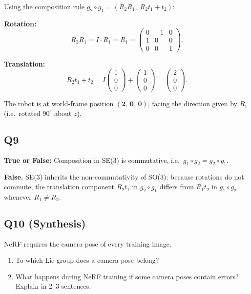 \documentclass[12pt]{article}
\begin{document}
\begin{answerbox}
Using the composition rule $g_2\circ g_1=(R_2 R_1,\;R_2 t_1+t_2)$:

\textbf{Rotation:}
\[
  R_2 R_1 = I\cdot R_1 = R_1
  = \begin{pmatrix}0&-1&0\\1&0&0\\0&0&1\end{pmatrix}.
\]

\textbf{Translation:}
\[
  R_2 t_1 + t_2 = I\begin{pmatrix}1\\0\\0\end{pmatrix}
                 + \begin{pmatrix}1\\0\\0\end{pmatrix}
                 = \begin{pmatrix}2\\0\\0\end{pmatrix}.
\]

The robot is at world-frame position $\mathbf{(2,\,0,\,0)}$, facing the
direction given by $R_1$ (i.e.\ rotated $90^\circ$ about $z$).
\end{answerbox}

\subsection*{Q9}
\textbf{True or False:} Composition in SE(3) is commutative, i.e.\
$g_1\circ g_2 = g_2\circ g_1$.

\begin{answerbox}
\textbf{False.}  SE(3) inherits the non-commutativity of SO(3): because
rotations do not commute, the translation component $R_2 t_1$ in $g_2\circ g_1$
differs from $R_1 t_2$ in $g_1\circ g_2$ whenever $R_1\neq R_2$.
\end{answerbox}

\subsection*{Q10 (Synthesis)}
NeRF requires the camera pose of every training image.

\begin{enumerate}[label=(\alph*)]
  \item To which Lie group does a camera pose belong?
  \item What happens during NeRF training if some camera poses contain errors?
        Explain in 2--3 sentences.
\end{enumerate}
\end{document}
